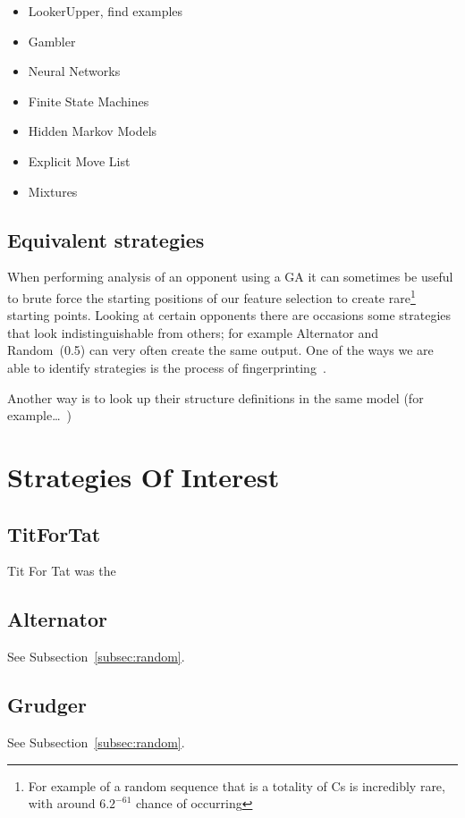 \begin{itemize}
 \item LookerUpper, find examples
 \item Gambler
 \item Neural Networks
 \item Finite State Machines
 \item Hidden Markov Models
 \item Explicit Move List
 \item Mixtures
\end{itemize}


\subsection{Equivalent strategies}\label{subsec:equivalentStrategies}
When performing analysis of an opponent using a GA it can sometimes be useful to brute force the starting positions of our feature selection to create rare\footnote{For example of a random sequence that is a totality of Cs is incredibly rare, with around \(6.2^{-61}\) chance of occurring} starting points.
Looking at certain opponents there are occasions some strategies that look indistinguishable from others;
for example Alternator and Random~(0.5) can very often create the same output.
One of the ways we are able to identify strategies is the process of fingerprinting~\cite{Ashlock2004,Ashlock2008}.

Another way is to look up their structure definitions in the same model (for example\ldots~)

\section{Strategies Of Interest}\label{sec:strategiesOfInterest}
\subsection{TitForTat}\label{subsec:titfortat}
Tit For Tat was the
\subsection{Alternator}\label{subsec:alternator}
See Subsection~\ref{subsec:random}.
\subsection{Grudger}\label{subsec:grudger}
See Subsection~\ref{subsec:random}.
